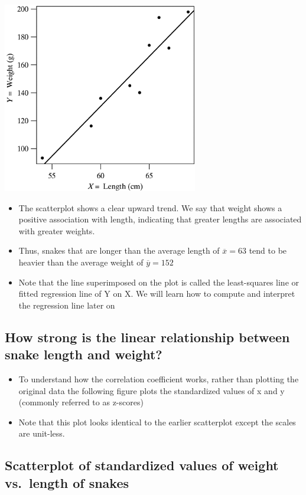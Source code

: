 \documentclass[
]{book}
\providecommand{\tightlist}{%
  \setlength{\itemsep}{0pt}\setlength{\parskip}{0pt}}
\begin{document}
\includegraphics[width=0.5\linewidth]{./11_39}

\begin{itemize}
\tightlist
\item
  The scatterplot shows a clear upward trend. We say that weight shows a positive association with length, indicating that greater lengths are associated with greater weights.
\item
  Thus, snakes that are longer than the average length of \(\overline x=63\) tend to be heavier than the average weight of \(\overline y=152\)
\item
  Note that the line superimposed on the plot is called the least-squares line or fitted regression line of Y on X. We will learn how to compute and interpret the regression line later on
\end{itemize}

\hypertarget{how-strong-is-the-linear-relationship-between-snake-length-and-weight}{%
\subsection{How strong is the linear relationship between snake length and weight?}\label{how-strong-is-the-linear-relationship-between-snake-length-and-weight}}

\begin{itemize}
\tightlist
\item
  To understand how the correlation coefficient works, rather than plotting the original data the following figure plots the standardized values of x and y (commonly referred to as z-scores)
\item
  Note that this plot looks identical to the earlier scatterplot except the scales are unit-less.
\end{itemize}

\hypertarget{scatterplot-of-standardized-values-of-weight-vs.-length-of-snakes}{%
\subsection{Scatterplot of standardized values of weight vs.~length of snakes}\label{scatterplot-of-standardized-values-of-weight-vs.-length-of-snakes}}
\end{document}
